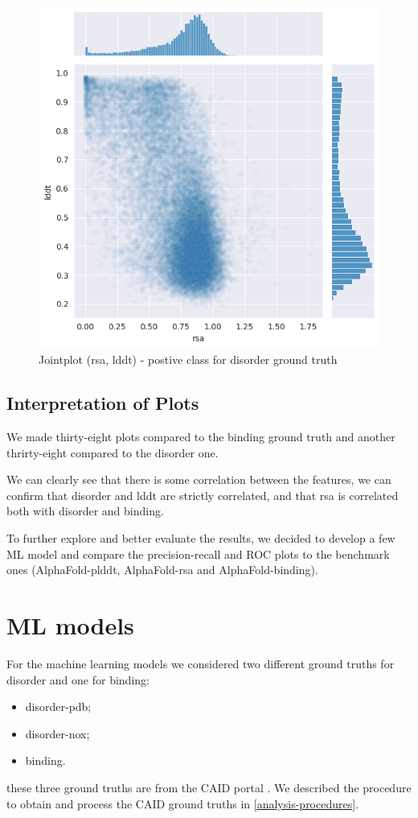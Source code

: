 \begin{figure}[h!]
    \includegraphics[width=\linewidth]{res/analysis/plots/dis1-jointplot_rsa-lddt.png}
    \caption{Jointplot (rsa, lddt) - postive class for disorder ground truth}
\end{figure}


\subsection{Interpretation of Plots}
We made thirty-eight plots compared to the binding ground truth and another thrirty-eight compared to the disorder one. 

We can clearly see that there is some correlation between the features, we can confirm that disorder and lddt are strictly correlated, and that rsa is correlated both with disorder and binding. 

To further explore and better evaluate the results, we decided to develop a few ML model and compare the precision-recall and ROC plots to the benchmark ones (AlphaFold-plddt, AlphaFold-rsa and AlphaFold-binding).

\section{ML models}
For the machine learning models we considered two different ground truths for disorder and one for binding:
\begin{itemize}
    \item disorder-pdb;
    \item disorder-nox;
    \item binding.
\end{itemize}
these three ground truths are from the CAID portal \cite{caid}. We described the procedure to obtain and process the CAID ground truths in \ref{analysis-procedures}.

